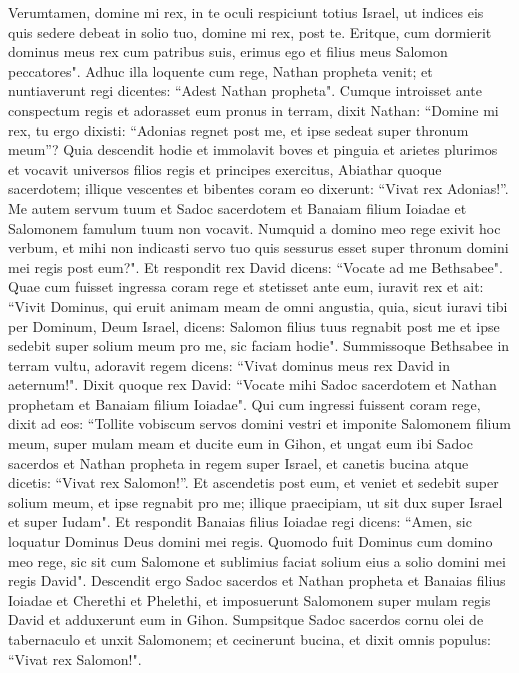 \begin{biblechapter}
\verse Verumtamen, domine mi rex, in te oculi respiciunt totius Israel, ut indices eis quis sedere debeat in solio tuo, domine mi rex, post te. 
\verse Eritque, cum dormierit dominus meus rex cum patribus suis, erimus ego et filius meus Salomon peccatores". 
\verse Adhuc illa loquente cum rege, Nathan propheta venit; 
\verse et nuntiaverunt regi dicentes: “Adest Nathan propheta". Cumque introisset ante conspectum regis et adorasset eum pronus in terram, 
\verse dixit Nathan: “Domine mi rex, tu ergo dixisti: “Adonias regnet post me, et ipse sedeat super thronum meum”?  
\verse Quia descendit hodie et immolavit boves et pinguia et arietes plurimos et vocavit universos filios regis et principes exercitus, Abiathar quoque sacerdotem; illique vescentes et bibentes coram eo dixerunt: “Vivat rex Adonias!”. 
\verse Me autem servum tuum et Sadoc sacerdotem et Banaiam filium Ioiadae et Salomonem famulum tuum non vocavit. 
\verse Numquid a domino meo rege exivit hoc verbum, et mihi non indicasti servo tuo quis sessurus esset super thronum domini mei regis post eum?". 
\verse Et respondit rex David dicens: “Vocate ad me Bethsabee". Quae cum fuisset ingressa coram rege et stetisset ante eum, 
\verse iuravit rex et ait: “Vivit Dominus, qui eruit animam meam de omni angustia, 
\verse quia, sicut iuravi tibi per Dominum, Deum Israel, dicens: Salomon filius tuus regnabit post me et ipse sedebit super solium meum pro me, sic faciam hodie". 
\verse Summissoque Bethsabee in terram vultu, adoravit regem dicens: “Vivat dominus meus rex David in aeternum!". 
\verse Dixit quoque rex David: “Vocate mihi Sadoc sacerdotem et Nathan prophetam et Banaiam filium Ioiadae". Qui cum ingressi fuissent coram rege, 
\verse dixit ad eos: “Tollite vobiscum servos domini vestri et imponite Salomonem filium meum, super mulam meam et ducite eum in Gihon, 
\verse et ungat eum ibi Sadoc sacerdos et Nathan propheta in regem super Israel, et canetis bucina atque dicetis: “Vivat rex Salomon!”. 
\verse Et ascendetis post eum, et veniet et sedebit super solium meum, et ipse regnabit pro me; illique praecipiam, ut sit dux super Israel et super Iudam". 
\verse Et respondit Banaias filius Ioiadae regi dicens: “Amen, sic loquatur Dominus Deus domini mei regis. 
\verse Quomodo fuit Dominus cum domino meo rege, sic sit cum Salomone et sublimius faciat solium eius a solio domini mei regis David". 
\verse Descendit ergo Sadoc sacerdos et Nathan propheta et Banaias filius Ioiadae et Cherethi et Phelethi, et imposuerunt Salomonem super mulam regis David et adduxerunt eum in Gihon. 
\verse Sumpsitque Sadoc sacerdos cornu olei de tabernaculo et unxit Salomonem; et cecinerunt bucina, et dixit omnis populus: “Vivat rex Salomon!". 

\end{biblechapter}
